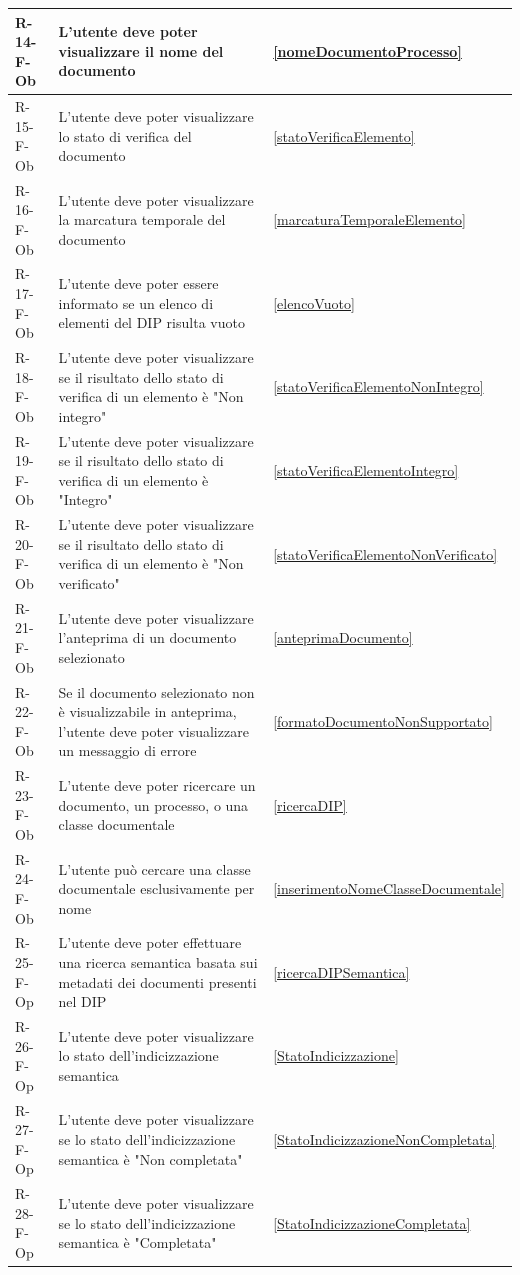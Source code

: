 \begin{longtable}{|p{2.5cm}|p{9.5cm}|p{2.5cm}|}
\hline
R-14-F-Ob & L'utente deve poter visualizzare il nome del documento & \ref{nomeDocumentoProcesso} \\
\hline
R-15-F-Ob & L'utente deve poter visualizzare lo stato di verifica del documento & \ref{statoVerificaElemento} \\
\hline
R-16-F-Ob & L'utente deve poter visualizzare la marcatura temporale del documento & \ref{marcaturaTemporaleElemento} \\
\hline
R-17-F-Ob & L'utente deve poter essere informato se un elenco di elementi del DIP risulta vuoto & \ref{elencoVuoto} \\
\hline
R-18-F-Ob & L'utente deve poter visualizzare se il risultato dello stato di verifica di un elemento è "Non integro" & \ref{statoVerificaElementoNonIntegro} \\
\hline
R-19-F-Ob & L'utente deve poter visualizzare se il risultato dello stato di verifica di un elemento è "Integro" & \ref{statoVerificaElementoIntegro} \\
\hline
R-20-F-Ob & L'utente deve poter visualizzare se il risultato dello stato di verifica di un elemento è "Non verificato" & \ref{statoVerificaElementoNonVerificato} \\
\hline
R-21-F-Ob & L'utente deve poter visualizzare l'anteprima di un documento selezionato & \ref{anteprimaDocumento} \\
\hline
R-22-F-Ob & Se il documento selezionato non è visualizzabile in anteprima, l'utente deve poter visualizzare un messaggio di errore & \ref{formatoDocumentoNonSupportato} \\
\hline
R-23-F-Ob & L'utente deve poter ricercare un documento, un processo, o una classe documentale & \ref{ricercaDIP} \\
\hline
R-24-F-Ob & L'utente può cercare una classe documentale esclusivamente per nome & \ref{inserimentoNomeClasseDocumentale} \\
\hline
R-25-F-Op & L'utente deve poter effettuare una ricerca semantica basata sui metadati dei documenti presenti nel DIP & \ref{ricercaDIPSemantica} \\
\hline
R-26-F-Op & L'utente deve poter visualizzare lo stato dell'indicizzazione semantica & \ref{StatoIndicizzazione} \\
\hline
R-27-F-Op & L'utente deve poter visualizzare se lo stato dell'indicizzazione semantica è "Non completata" & \ref{StatoIndicizzazioneNonCompletata} \\
\hline
R-28-F-Op & L'utente deve poter visualizzare se lo stato dell'indicizzazione semantica è "Completata" & \ref{StatoIndicizzazioneCompletata} \\

\end{longtable}
